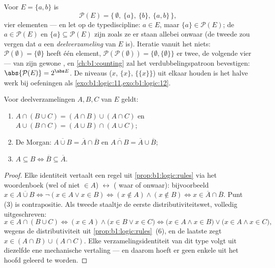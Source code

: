\begin{example}\label{ex:b1:logic:powerset}
Voor $E = \{a, b\}$ is
\[
\mathcal P(E) = \bigl\{\, \emptyset,\ \{a\},\ \{b\},\ \{a, b\}
\,\bigr\},
\]
vier elementen --- en let op de typediscipline: $a \in E$, maar $\{a\}
\in \mathcal P(E)$; de  $a \in \mathcal P(E)$ en $\{a\}
\subseteq \mathcal P(E)$ zijn zoals ze er staan allebei onwaar (de tweede
zou vergen dat $a$ een \emph{deelverzameling} van $E$ is). Iteratie
vanuit het niets: $\mathcal P(\emptyset) = \{\emptyset\}$ heeft één
element, $\mathcal P(\mathcal P(\emptyset)) = \{\emptyset,
\{\emptyset\}\}$ er twee, de volgende vier ---  van
 zijn gewone , en \cref{ch:b1:counting} zal het
verdubbelingspatroon bevestigen: $\abs{\mathcal P(E)} = 2^{\abs E}$. De
niveaus ($x$, $\{x\}$, $\{\{x\}\}$) uit elkaar houden is het halve werk
bij oefeningen als \cref{exo:b1:logic:11,exo:b1:logic:12}.
\end{example}

\begin{proposition}[Verzamelingenalgebra]\label{prop:b1:logic:setalgebra}
Voor deelverzamelingen $A, B, C$ van $E$ geldt:
\begin{enumerate}
  \item $A \cap (B \cup C) = (A \cap B) \cup (A \cap C)$ en
        $A \cup (B \cap C) = (A \cup B) \cap (A \cup C)$;
  \item De Morgan: $\overline{A \cup B} = \overline{A} \cap
        \overline{B}$ en $\overline{A \cap B} = \overline{A} \cup
        \overline{B}$;
  \item $A \subseteq B \iff \overline{B} \subseteq \overline{A}$.
\end{enumerate}
\end{proposition}

\begin{proof}
Elke identiteit vertaalt een regel uit \cref{prop:b1:logic:rules} via
het woordenboek (wel of niet $\in A$) $\leftrightarrow$ ( waar
of onwaar): bijvoorbeeld $x \in \overline{A \cup B} \iff \lnot(x \in A
\lor x \in B) \iff (x \notin A) \land (x \notin B) \iff x \in
\overline{A} \cap \overline{B}$. Punt (3) is contrapositie. Als tweede
staaltje de eerste distributiviteitswet, volledig uitgeschreven:
\[
x \in A \cap (B \cup C)
\iff (x \in A) \land \bigl(x \in B \lor x \in C\bigr)
\iff \bigl(x \in A \land x \in B\bigr) \lor
\bigl(x \in A \land x \in C\bigr),
\]
wegens de distributiviteit uit \cref{prop:b1:logic:rules}~(6), en de
laatste  zegt $x \in (A \cap B) \cup (A \cap C)$. Elke
verzamelingsidentiteit van dit type volgt uit diezelfde ene mechanische
vertaling --- en daarom hoeft er geen enkele uit het hoofd geleerd te
worden.
\end{proof}

